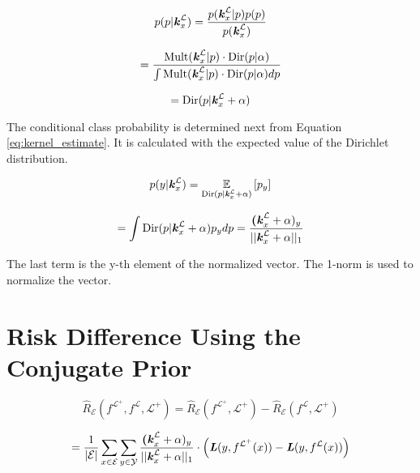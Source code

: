 \begin{equation}
p(p|\textbf{\textit{k}}^{\mathcal{L}}_x) = \frac{p(\textbf{\textit{k}}^{\mathcal{L}}_x|p)p(p)}{p(\textbf{\textit{k}}^{\mathcal{L}}_x)}
\label{eq:bayes}
\end{equation}

\begin{equation}
= \frac{\text{Mult}(\textbf{\textit{k}}^{\mathcal{L}}_x|p) \cdot \text{Dir}(p|\alpha)}{\int \text{Mult}(\textbf{\textit{k}}^{\mathcal{L}}_x|p) \cdot \text{Dir}(p|\alpha) dp}
\end{equation}

\begin{equation}
= \text{Dir}(p|\textbf{\textit{k}}^{\mathcal{L}}_x + \alpha)
\end{equation}

The conditional class probability is determined next from Equation \ref{eq:kernel_estimate}. It is calculated with the expected value of the Dirichlet distribution.

\begin{equation}
p(y|\textbf{\textit{k}}^{\mathcal{L}}_x) = \underset{\text{Dir}(p|\textbf{\textit{k}}^{\mathcal{L}}_x+ \alpha)}{\mathbb{E}} \left[ p_y \right]
\end{equation}

\begin{equation}
= \int \text{Dir}(p|\textbf{\textit{k}}^{\mathcal{L}}_x + \alpha) p_y dp = \frac{\textbf{(\textit{k}}^{\mathcal{L}}_x + \alpha)_y}{||\textbf{\textit{k}}^{\mathcal{L}}_x + \alpha ||_1}
\end{equation}

The last term is the y-th element of the normalized vector. The 1-norm is used to normalize the vector.

\section{Risk Difference Using the Conjugate Prior}

\begin{equation}
    \hat{R}_{\mathcal{E}} (f^{\mathcal{L}^+}, f^{\mathcal{L}}, \mathcal{L}^+) = \hat{R}_{\mathcal{E}} (f^{\mathcal{L}^+}, \mathcal{L}^+) - \hat{R}_{\mathcal{E}} (f^{\mathcal{L}}, \mathcal{L}^+)
\end{equation}

\begin{equation}
    = \frac{1}{|\mathcal{E}|} \sum_{x \in \mathcal{E}} \sum_{y \in \mathcal{Y}}  \frac{\textbf{(\textit{k}}^{\mathcal{L}}_x + \alpha)_y}{||\textbf{\textit{k}}^{\mathcal{L}}_x + \alpha ||_1} \cdot \left( \textbf{\textit{L}} (y,f^{\mathcal{L}^+}(x)) - \textbf{\textit{L}}(y,f^{\mathcal{L}}(x)) \right)
\end{equation}

